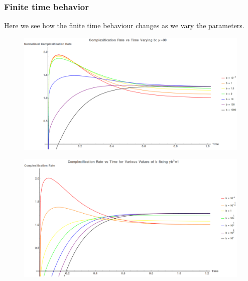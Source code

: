 \documentclass[8pt,aspectratio=169]{beamer}
\begin{document}
\begin{frame}
\frametitle{Finite time behavior}

Here we see how the finite time behaviour changes as we vary the parameters.

\begin{minipage}[t]{0.47\linewidth}

\begin{figure}
    \begin{center}
        \includegraphics[scale=0.15]{vary_b_fix_gamma}
    \end{center}
\end{figure}

\end{minipage}\hfill
%
\begin{minipage}[t]{0.47\linewidth}

\begin{figure}
    \begin{center}
        \includegraphics[scale=0.15]{vary_temp}
    \end{center}
\end{figure}

\end{minipage} 

\end{frame}
\end{document}
